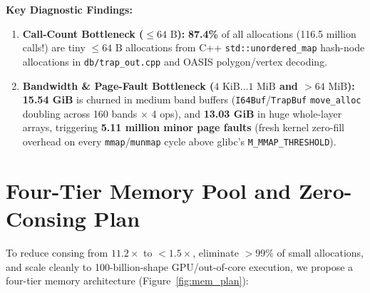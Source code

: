 \textbf{Key Diagnostic Findings:}
\begin{enumerate}
  \item \textbf{Call-Count Bottleneck ($\le 64\text{ B}$):} \textbf{87.4\%} of all allocations (116.5 million calls!) are tiny $\le 64\text{ B}$ allocations from C++ \texttt{std::unordered\_map} hash-node allocations in \texttt{db/trap\_out.cpp} and OASIS polygon/vertex decoding.
  \item \textbf{Bandwidth \& Page-Fault Bottleneck ($4\text{ KiB}\dots 1\text{ MiB}$ and $> 64\text{ MiB}$):} \textbf{15.54 GiB} is churned in medium band buffers (\texttt{I64Buf}/\texttt{TrapBuf} \texttt{move\_alloc} doubling across 160 bands $\times$ 4 ops), and \textbf{13.03 GiB} in huge whole-layer arrays, triggering \textbf{5.11 million minor page faults} (fresh kernel zero-fill overhead on every \texttt{mmap}/\texttt{munmap} cycle above glibc's \texttt{M\_MMAP\_THRESHOLD}).
\end{enumerate}

\section{Four-Tier Memory Pool and Zero-Consing Plan}

To reduce consing from $11.2\times$ to $< 1.5\times$, eliminate $> 99\%$ of small allocations, and scale cleanly to 100-billion-shape GPU/out-of-core execution, we propose a four-tier memory architecture (Figure~\ref{fig:mem_plan}):

